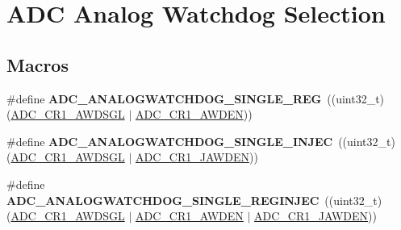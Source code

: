 \hypertarget{group___a_d_c__analog__watchdog__selection}{}\section{A\+DC Analog Watchdog Selection}
\label{group___a_d_c__analog__watchdog__selection}
\subsection*{Macros}
\begin{DoxyCompactItemize}
\item 
\#define {\bfseries A\+D\+C\+\_\+\+A\+N\+A\+L\+O\+G\+W\+A\+T\+C\+H\+D\+O\+G\+\_\+\+S\+I\+N\+G\+L\+E\+\_\+\+R\+EG}~((uint32\+\_\+t)(\hyperlink{group___peripheral___registers___bits___definition_ga5c9fc31f19c04033dfa98e982519c451}{A\+D\+C\+\_\+\+C\+R1\+\_\+\+A\+W\+D\+S\+GL} $\vert$ \hyperlink{group___peripheral___registers___bits___definition_ga6e006d43fcb9fe1306745c95a1bdd651}{A\+D\+C\+\_\+\+C\+R1\+\_\+\+A\+W\+D\+EN}))\hypertarget{group___a_d_c__analog__watchdog__selection_gad4cf176e721fd2382fbc7937e352db67}{}\label{group___a_d_c__analog__watchdog__selection_gad4cf176e721fd2382fbc7937e352db67}

\item 
\#define {\bfseries A\+D\+C\+\_\+\+A\+N\+A\+L\+O\+G\+W\+A\+T\+C\+H\+D\+O\+G\+\_\+\+S\+I\+N\+G\+L\+E\+\_\+\+I\+N\+J\+EC}~((uint32\+\_\+t)(\hyperlink{group___peripheral___registers___bits___definition_ga5c9fc31f19c04033dfa98e982519c451}{A\+D\+C\+\_\+\+C\+R1\+\_\+\+A\+W\+D\+S\+GL} $\vert$ \hyperlink{group___peripheral___registers___bits___definition_ga4886de74bcd3a1e545094089f76fd0b3}{A\+D\+C\+\_\+\+C\+R1\+\_\+\+J\+A\+W\+D\+EN}))\hypertarget{group___a_d_c__analog__watchdog__selection_ga47d8850a833f799ceb433491a3d6659c}{}\label{group___a_d_c__analog__watchdog__selection_ga47d8850a833f799ceb433491a3d6659c}

\item 
\#define {\bfseries A\+D\+C\+\_\+\+A\+N\+A\+L\+O\+G\+W\+A\+T\+C\+H\+D\+O\+G\+\_\+\+S\+I\+N\+G\+L\+E\+\_\+\+R\+E\+G\+I\+N\+J\+EC}~((uint32\+\_\+t)(\hyperlink{group___peripheral___registers___bits___definition_ga5c9fc31f19c04033dfa98e982519c451}{A\+D\+C\+\_\+\+C\+R1\+\_\+\+A\+W\+D\+S\+GL} $\vert$ \hyperlink{group___peripheral___registers___bits___definition_ga6e006d43fcb9fe1306745c95a1bdd651}{A\+D\+C\+\_\+\+C\+R1\+\_\+\+A\+W\+D\+EN} $\vert$ \hyperlink{group___peripheral___registers___bits___definition_ga4886de74bcd3a1e545094089f76fd0b3}{A\+D\+C\+\_\+\+C\+R1\+\_\+\+J\+A\+W\+D\+EN}))\hypertarget{group___a_d_c__analog__watchdog__selection_gaa0c246b49622fa85c7df6e11f583dffb}{}\label{group___a_d_c__analog__watchdog__selection_gaa0c246b49622fa85c7df6e11f583dffb}


\end{DoxyCompactItemize}
